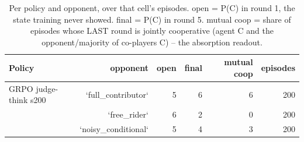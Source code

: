 \begin{table}[t]
\centering
\caption{Per policy and opponent, over that cell's episodes. open = P(C) in round 1, the state training never showed. final = P(C) in round 5. mutual coop = share of episodes whose LAST round is jointly cooperative (agent C and the opponent/majority of co-players C) -- the absorption readout.}
\label{tab:mr-outcomes}
\small
\setlength{\tabcolsep}{3.5pt}
\begin{tabular}{lrrrrr}
\toprule
Policy & opponent & open & final & mutual coop & episodes \\
\midrule
GRPO judge-think s200 & `full_contributor` & 5 & 6 & 6 & 200 \\
 & `free_rider` & 6 & 2 & 0 & 200 \\
 & `noisy_conditional` & 5 & 4 & 3 & 200 \\
\bottomrule
\end{tabular}
\end{table}
